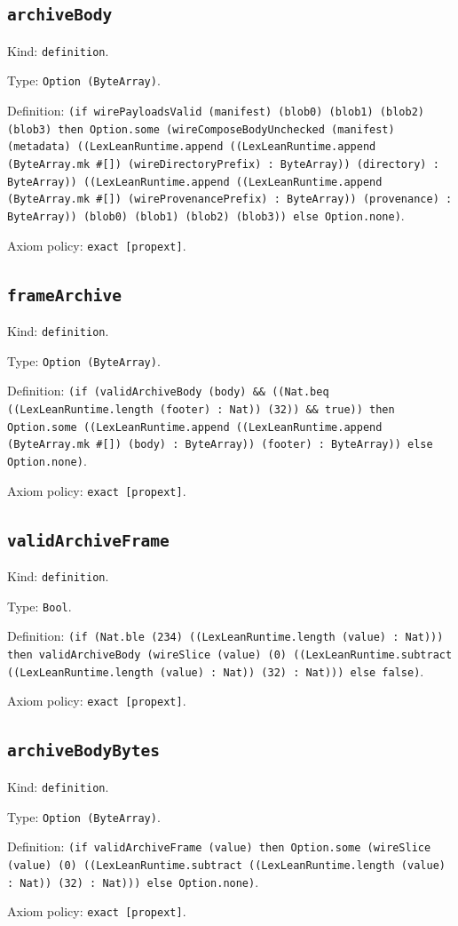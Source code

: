 \documentclass[11pt]{article}
\begin{document}
\subsection*{\texttt{archiveBody}}
\noindent Kind: \texttt{definition}.\par
\noindent Type: \texttt{Option (ByteArray)}.\par
\noindent Definition: \texttt{(if wirePayloadsValid (manifest) (blob0) (blob1) (blob2) (blob3) then Option.some (wireComposeBodyUnchecked (manifest) (metadata) ((LexLeanRuntime.append ((LexLeanRuntime.append (ByteArray.mk \#[]) (wireDirectoryPrefix) : ByteArray)) (directory) : ByteArray)) ((LexLeanRuntime.append ((LexLeanRuntime.append (ByteArray.mk \#[]) (wireProvenancePrefix) : ByteArray)) (provenance) : ByteArray)) (blob0) (blob1) (blob2) (blob3)) else Option.none)}.\par
\noindent Axiom policy: \texttt{exact [propext]}.\par
\subsection*{\texttt{frameArchive}}
\noindent Kind: \texttt{definition}.\par
\noindent Type: \texttt{Option (ByteArray)}.\par
\noindent Definition: \texttt{(if (validArchiveBody (body) \&\& ((Nat.beq ((LexLeanRuntime.length (footer) : Nat)) (32)) \&\& true)) then Option.some ((LexLeanRuntime.append ((LexLeanRuntime.append (ByteArray.mk \#[]) (body) : ByteArray)) (footer) : ByteArray)) else Option.none)}.\par
\noindent Axiom policy: \texttt{exact [propext]}.\par
\subsection*{\texttt{validArchiveFrame}}
\noindent Kind: \texttt{definition}.\par
\noindent Type: \texttt{Bool}.\par
\noindent Definition: \texttt{(if (Nat.ble (234) ((LexLeanRuntime.length (value) : Nat))) then validArchiveBody (wireSlice (value) (0) ((LexLeanRuntime.subtract ((LexLeanRuntime.length (value) : Nat)) (32) : Nat))) else false)}.\par
\noindent Axiom policy: \texttt{exact [propext]}.\par
\subsection*{\texttt{archiveBodyBytes}}
\noindent Kind: \texttt{definition}.\par
\noindent Type: \texttt{Option (ByteArray)}.\par
\noindent Definition: \texttt{(if validArchiveFrame (value) then Option.some (wireSlice (value) (0) ((LexLeanRuntime.subtract ((LexLeanRuntime.length (value) : Nat)) (32) : Nat))) else Option.none)}.\par
\noindent Axiom policy: \texttt{exact [propext]}.\par
\end{document}

